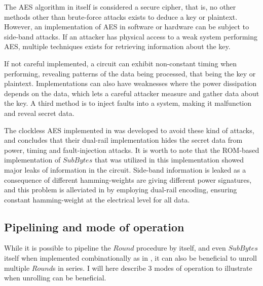 The AES algorithm in itself is considered a secure cipher, that is, no
other methods other than brute-force attacks exists to deduce a key or
plaintext. However, an implementation of AES in software or hardware
can be subject to side-band attacks. If an attacker has physical
access to a weak system performing AES, multiple techniques exists for
retrieving information about the key.

If not careful implemented, a circuit can exhibit non-constant timing
when performing, revealing patterns of the data being processed, that
being the key or plaintext. Implementations can also have weaknesses
where the power dissipation depends on the data, which lets a careful
attacker measure and gather data about the key. A third method is to
inject faults into a system, making it malfunction and reveal secret
data.

The clockless AES implemented in \cite{claes} was developed to avoid
these kind of attacks, and concludes that their dual-rail
implementation hides the secret data from power, timing and
fault-injection attacks. It is worth to note that the ROM-based
implementation of $SubBytes$ that was utilized in this implementation
showed major leaks of information in the circuit. Side-band
information is leaked as a consequence of different hamming-weights
are giving different power signatures, and this problem is alleviated
in \cite{claes} by employing dual-rail encoding, ensuring constant
hamming-weight at the electrical level for all data.

\subsection{Pipelining and mode of operation}

While it is possible to pipeline the $Round$ procedure by itself, and
even $SubBytes$ itself when implemented combinationally as in
\cite{csbox}, it can also be beneficial to unroll multiple $Round$s in
series. I will here describe 3 modes of operation to illustrate when
unrolling can be beneficial.

